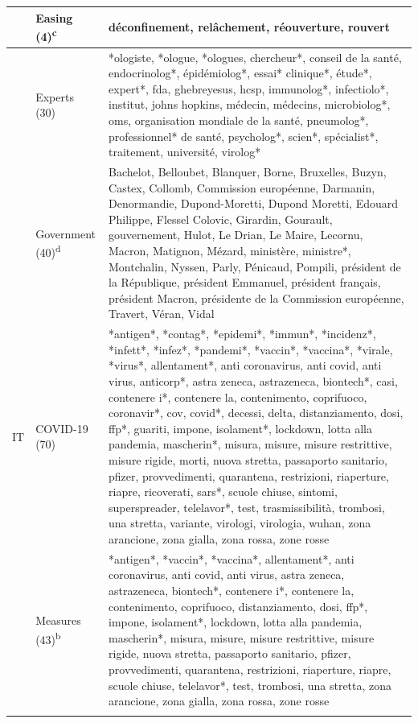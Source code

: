 \documentclass[
]{ccr}
\begin{document}
{\begin{spacing}{.9}
\begin{longtable}[]{@{}
  >{\raggedright\arraybackslash}p{.09\linewidth}
  >{\raggedright\arraybackslash}p{.12\linewidth}
  >{\raggedright\arraybackslash}p{.71\linewidth}@{}}
& Easing (4)\textsuperscript{c} & déconfinement, relâchement,
réouverture, rouvert \\ \cline{2-3}

& Experts (30) & *ologiste, *ologue, *ologues, chercheur*, conseil de la
santé, endocrinolog*, épidémiolog*, essai* clinique*, étude*, expert*,
fda, ghebreyesus, hcsp, immunolog*, infectiolo*, institut, johns
hopkins, médecin, médecins, microbiolog*, oms, organisation mondiale de
la santé, pneumolog*, professionnel* de santé, psycholog*, scien*,
spécialist*, traitement, université, virolog* \\ \cline{2-3}

& Government (40)\textsuperscript{d} & Bachelot, Belloubet, Blanquer,
Borne, Bruxelles, Buzyn, Castex, Collomb, Commission européenne,
Darmanin, Denormandie, Dupond-Moretti, Dupond Moretti, Edouard Philippe,
Flessel Colovic, Girardin, Gourault, gouvernement, Hulot, Le Drian, Le
Maire, Lecornu, Macron, Matignon, Mézard, ministère, ministre*,
Montchalin, Nyssen, Parly, Pénicaud, Pompili, président de la
République, président Emmanuel, président français, président Macron,
présidente de la Commission européenne, Travert, Véran, Vidal \\ \cline{1-3}

IT & COVID-19 (70) & *antigen*, *contag*, *epidemi*, *immun*,
*incidenz*, *infett*, *infez*, *pandemi*, *vaccin*, *vaccina*, *virale,
*virus*, allentament*, anti coronavirus, anti covid, anti virus,
anticorp*, astra zeneca, astrazeneca, biontech*, casi, contenere i*,
contenere la, contenimento, coprifuoco, coronavir*, cov, covid*,
decessi, delta, distanziamento, dosi, ffp*, guariti, impone, isolament*,
lockdown, lotta alla pandemia, mascherin*, misura, misure, misure
restrittive, misure rigide, morti, nuova stretta, passaporto sanitario,
pfizer, provvedimenti, quarantena, restrizioni, riaperture, riapre,
ricoverati, sars*, scuole chiuse, sintomi, superspreader, telelavor*,
test, trasmissibilità, trombosi, una stretta, variante, virologi,
virologia, wuhan, zona arancione, zona gialla, zona rossa, zone rosse \\ \cline{2-3}

& Measures (43)\textsuperscript{b} & *antigen*, *vaccin*, *vaccina*,
allentament*, anti coronavirus, anti covid, anti virus, astra zeneca,
astrazeneca, biontech*, contenere i*, contenere la, contenimento,
coprifuoco, distanziamento, dosi, ffp*, impone, isolament*, lockdown,
lotta alla pandemia, mascherin*, misura, misure, misure restrittive,
misure rigide, nuova stretta, passaporto sanitario, pfizer,
provvedimenti, quarantena, restrizioni, riaperture, riapre, scuole
chiuse, telelavor*, test, trombosi, una stretta, zona arancione, zona
gialla, zona rossa, zone rosse \\ \cline{2-3}
 

\end{longtable}
\end{spacing}}
\end{document}

